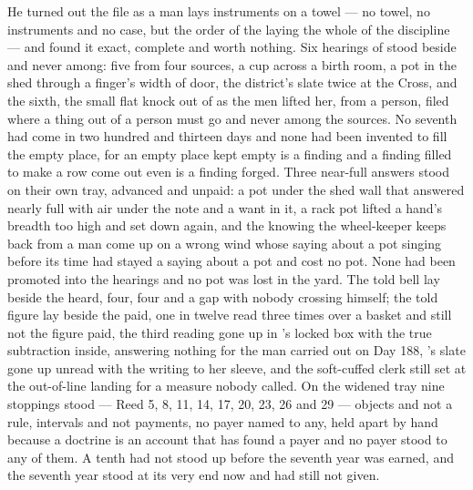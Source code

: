 He turned out the file as a man lays instruments on a towel --- no towel, no instruments and no case, but the order of the laying the whole of the discipline --- and found it exact, complete and worth nothing. Six hearings of  stood beside and never among: five from four sources, a cup across a birth room, a pot in the shed through a finger's width of door, the district's slate twice at the Cross, and the sixth, the small flat knock out of  as the men lifted her, from a person, filed where a thing out of a person must go and never among the sources. No seventh had come in two hundred and thirteen days and none had been invented to fill the empty place, for an empty place kept empty is a finding and a finding filled to make a row come out even is a finding forged. Three near-full answers stood on their own tray, advanced and unpaid: a pot under the shed wall that answered nearly full with air under the note and a want in it, a rack pot lifted a hand's breadth too high and set down again, and the knowing the wheel-keeper keeps back from a man come up on a wrong wind whose saying about a pot singing before its time had stayed a saying about a pot and cost no pot. None had been promoted into the hearings and no pot was lost in the yard. The told bell lay beside the heard, four, four and a gap with nobody crossing himself; the told figure lay beside the paid, one in twelve read three times over a basket and still not the figure paid, the third reading gone up  in 's locked box with the true subtraction inside, answering nothing for the man carried out on Day 188, 's slate gone up unread with the writing to her sleeve, and the soft-cuffed clerk still set at the out-of-line landing for a measure nobody called. On the widened tray nine stoppings stood --- Reed 5, 8, 11, 14, 17, 20, 23, 26 and 29 --- objects and not a rule, intervals and not payments, no payer named to any, held apart by hand because a doctrine is an account that has found a payer and no payer stood to any of them. A tenth had not stood up before the seventh year was earned, and the seventh year stood at its very end now and had still not given.

